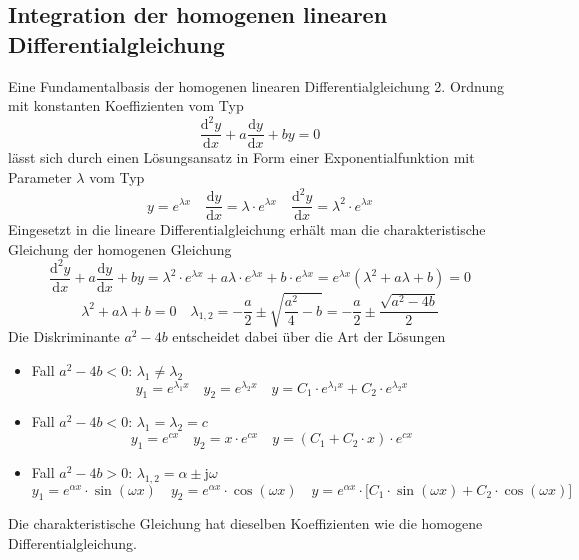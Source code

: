 \subsection{Integration der homogenen linearen Differentialgleichung}
Eine Fundamentalbasis der homogenen linearen Differentialgleichung 2. Ordnung mit konstanten Koeffizienten vom Typ
\begin{equation}
\boxed{\dfrac{\text{d}^2y}{\text{d}x}+a\dfrac{\text{d}y}{\text{d}x}+by=0}
\end{equation}
lässt sich durch einen Lösungsansatz in Form einer Exponentialfunktion mit Parameter $\lambda$ vom Typ
\begin{equation}
\boxed{y=e^{\lambda x}}\quad \boxed{\dfrac{\text{d}y}{\text{d}x}=\lambda \cdot e^{\lambda x}}\quad \boxed{\dfrac{\text{d}^2y}{\text{d}x}=\lambda^2\cdot e^{\lambda x}}
\end{equation}
Eingesetzt in die lineare Differentialgleichung erhält man die charakteristische Gleichung der homogenen Gleichung
\begin{equation}
\boxed{\dfrac{\text{d}^2y}{\text{d}x}+a\dfrac{\text{d}y}{\text{d}x}+by=\lambda^2\cdot e^{\lambda x}+a\lambda\cdot e^{\lambda x}+b\cdot e^{\lambda x}=e^{\lambda x}\left(\lambda^2+a\lambda+b\right)=0}
\end{equation}
\begin{equation}
\boxed{\lambda^2+a\lambda+b=0}\quad \boxed{\lambda_{1,2}=-\dfrac{a}{2}\pm \sqrt{\dfrac{a^2}{4}-b}=-\dfrac{a}{2}\pm \dfrac{\sqrt{a^2-4b}}{2}}
\end{equation}
Die Diskriminante $a^2-4b$ entscheidet dabei über die Art der Lösungen
\begin{itemize}
\item Fall $a^2-4b<0$: $\lambda_1\neq \lambda_2$
\begin{equation}
\boxed{y_1=e^{\lambda_1 x}}\quad \boxed{y_2=e^{\lambda_2 x}}\quad \boxed{y=C_1\cdot e^{\lambda_1 x}+C_2\cdot e^{\lambda_2 x}}
\end{equation}
\item Fall $a^2-4b<0$: $\lambda_1=\lambda_2=c$
\begin{equation}
\boxed{y_1=e^{c x}}\quad \boxed{y_2=x\cdot e^{c x}}\quad \boxed{y=\left(C_1+C_2\cdot x\right)\cdot e^{c x}}
\end{equation}
\item Fall $a^2-4b>0$: $\lambda_{1,2}=\alpha\pm\text{j}\omega$
\begin{equation}
\boxed{y_1=e^{\alpha x}\cdot \sin\left(\omega x\right)}\quad \boxed{y_2=e^{\alpha x}\cdot \cos\left(\omega x\right)}\quad \boxed{y=e^{\alpha x}\cdot \Big[C_1\cdot \sin\left(\omega x\right)+C_2\cdot \cos\left(\omega x\right)\Big]}
\end{equation}
\end{itemize}
Die charakteristische Gleichung hat dieselben Koeffizienten wie die homogene Differentialgleichung.
